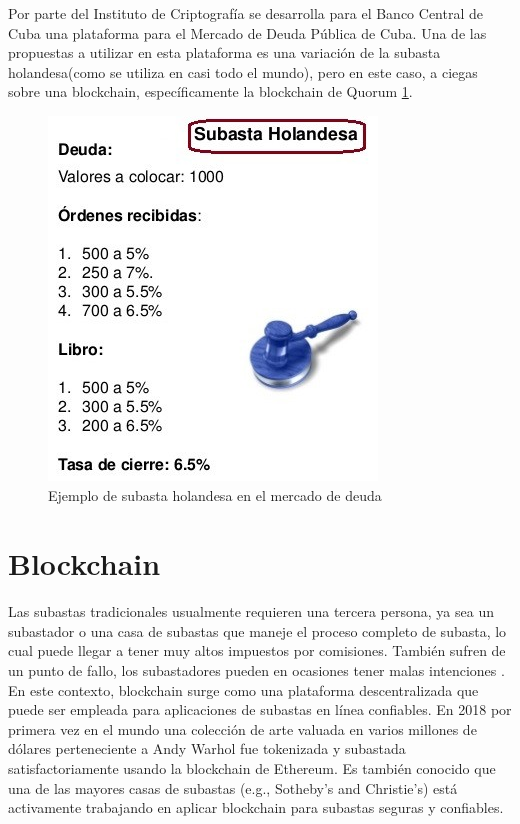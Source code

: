     Por parte del Instituto de Criptografía se desarrolla para el Banco Central de Cuba una plataforma para el Mercado de Deuda Pública de 
    Cuba. Una de las propuestas a utilizar en esta plataforma es una variación de la subasta holandesa(como se utiliza en casi todo el 
    mundo), pero en este caso, a ciegas sobre una blockchain, específicamente la blockchain de Quorum \ref{dutch_auction}.

    \begin{figure}[H]
      \center
      \includegraphics[scale=0.7]{photos/subasta-holandesa1.jpg}
      \caption{Ejemplo de subasta holandesa en el mercado de deuda}
      \label{dutch_auction}
    \end{figure}

\section{Blockchain} \hspace*{}
  Las subastas tradicionales usualmente requieren una tercera persona, ya sea un subastador o una 
  casa de subastas que maneje el proceso completo de subasta, lo cual puede llegar a tener muy altos
  impuestos por comisiones. También sufren de un punto de fallo, los subastadores pueden en ocasiones 
  tener malas intenciones \parencite{wu2019}. En este contexto, blockchain surge como una plataforma descentralizada que
  puede ser empleada para aplicaciones de subastas en línea confiables. En 2018 por primera vez en el 
  mundo una colección de arte valuada en varios millones de dólares perteneciente a Andy Warhol fue tokenizada
  y subastada satisfactoriamente usando la blockchain de Ethereum\parencite{wood2021}\parencite{emem}. Es también
  conocido que una de las mayores casas de subastas (e.g., Sotheby’s and Christie’s) está activamente
  trabajando en aplicar blockchain para subastas seguras y confiables. \parencite{neuendorf2018}

